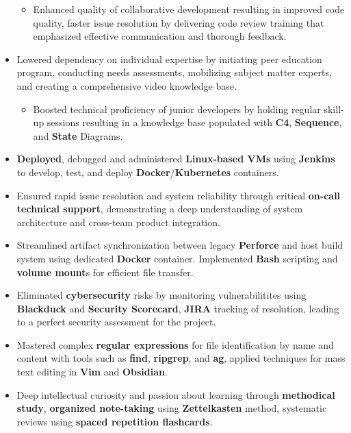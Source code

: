 \documentclass[a4paper]{article}
\begin{document}
\begin{itemize}
\begin{itemize}
	    \item Enhanced quality of collaborative development resulting in improved code quality, faster issue resolution by delivering code review training that emphasized effective communication and thorough feedback.
    \end{itemize}
	\item Lowered dependency on individual expertise by initiating peer education program, conducting needs assessments, mobilizing subject matter experts, and creating a comprehensive video knowledge base.
    \begin{itemize}
	    \item Boosted technical proficiency of junior developers by holding regular skill-up sessions resulting in a knowledge base populated with \textbf{C4}, \textbf{Sequence}, and \textbf{State} Diagrams.
    \end{itemize}
	\item \textbf{Deployed}, debugged and administered \textbf{Linux-based VMs} using \textbf{Jenkins} to develop, test, and deploy \textbf{Docker}/\textbf{Kubernetes} containers.
	\item Ensured rapid issue resolution and system reliability through critical \textbf{on-call technical support}, demonstrating a deep understanding of system architecture and cross-team product integration.
	\item Streamlined artifact synchronization between legacy \textbf{Perforce} and host build system using dedicated \textbf{Docker} container. Implemented \textbf{Bash} scripting and \textbf{volume mount}s for efficient file transfer.
	\item Eliminated \textbf{cybersecurity} risks by monitoring vulnerabilitites using \textbf{Blackduck} and \textbf{Security Scorecard}, \textbf{JIRA} tracking of resolution, leading to a perfect security assessment for the project.
	\item Mastered complex \textbf{regular expressions} for file identification by name and content with tools such as \textbf{find}, \textbf{ripgrep}, and \textbf{ag}, applied techniques for mass text editing in \textbf{Vim} and \textbf{Obsidian}.
	\item Deep intellectual curiosity and passion about learning through \textbf{methodical study}, \textbf{organized note-taking} using \textbf{Zettelkasten} method, systematic reviews using \textbf{spaced repetition flashcards}.
\end{itemize}
\end{document}
